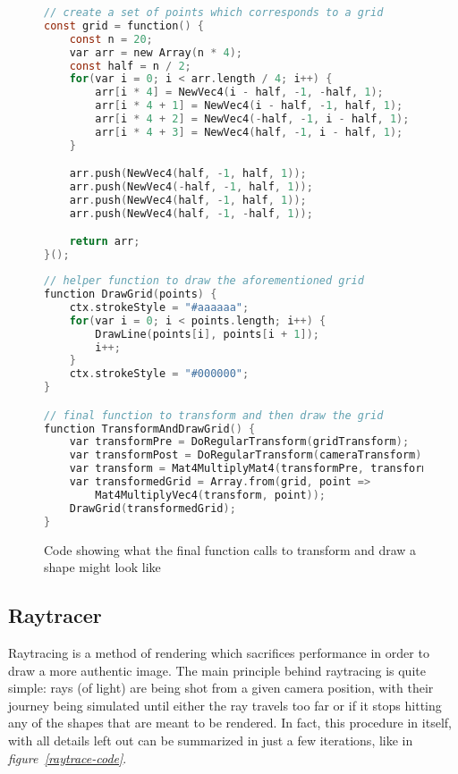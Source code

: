 \begin{figure}[H]
	\begin{center}
		\begin{lstlisting}[language=C]
// create a set of points which corresponds to a grid
const grid = function() {
	const n = 20;
	var arr = new Array(n * 4);
	const half = n / 2;
	for(var i = 0; i < arr.length / 4; i++) {
		arr[i * 4] = NewVec4(i - half, -1, -half, 1);
		arr[i * 4 + 1] = NewVec4(i - half, -1, half, 1);
		arr[i * 4 + 2] = NewVec4(-half, -1, i - half, 1);
		arr[i * 4 + 3] = NewVec4(half, -1, i - half, 1);
	}

	arr.push(NewVec4(half, -1, half, 1));
	arr.push(NewVec4(-half, -1, half, 1));
	arr.push(NewVec4(half, -1, half, 1));
	arr.push(NewVec4(half, -1, -half, 1));

	return arr;
}();
		\end{lstlisting}
	\end{center}
\end{figure}

\begin{figure}[H]
	\begin{center}
		\begin{lstlisting}[language=C]
// helper function to draw the aforementioned grid
function DrawGrid(points) {
	ctx.strokeStyle = "#aaaaaa";
	for(var i = 0; i < points.length; i++) {
		DrawLine(points[i], points[i + 1]);
		i++;
	}
	ctx.strokeStyle = "#000000";
}

// final function to transform and then draw the grid
function TransformAndDrawGrid() {
	var transformPre = DoRegularTransform(gridTransform);
	var transformPost = DoRegularTransform(cameraTransform);
	var transform = Mat4MultiplyMat4(transformPre, transformPost);
	var transformedGrid = Array.from(grid, point => 
		Mat4MultiplyVec4(transform, point));
	DrawGrid(transformedGrid);
}
		\end{lstlisting}
		\caption{Code showing what the final function calls to transform and draw a shape might look like}
	\end{center}
\end{figure}

\subsection{Raytracer}

Raytracing is a method of rendering which sacrifices performance in order to draw a more authentic image. The main principle behind raytracing is quite simple: rays (of light) are being shot from a given camera position, with their journey being simulated until either the ray travels too far or if it stops hitting any of the shapes that are meant to be rendered. In fact, this procedure in itself, with all details left out can be summarized in just a few iterations, like in \textit{figure~\ref{raytrace-code}}.

